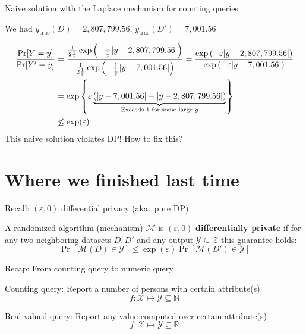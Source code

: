 \documentclass[12pt,aspectratio=169,handout]{beamer}
\begin{document}
\begin{frame}{Naive solution with the Laplace mechanism for counting queries}

We had $y_{\mathrm{true}}(D) = 2,807,799.56$, $y_{\mathrm{true}}(D') = 7,001.56$

$$
\begin{aligned}
\frac{\Pr[Y = y]}{\Pr[Y' = y]} &=
\frac{
\frac{1}{2\frac{1}{\varepsilon}} \exp \left(- \frac{1}{\frac{1}{\varepsilon}} \abs{y - 2,807,799.56} \right)
}{
\frac{1}{2\frac{1}{\varepsilon}} \exp \left(- \frac{1}{\frac{1}{\varepsilon}} \abs{y - 7,001.56} \right) 
}
=
\frac{
\exp \left(- \varepsilon \abs{y - 2,807,799.56} \right)
}{
\exp \left(- \varepsilon \abs{y - 7,001.56} \right) 
} \\
&=
\exp \left\{ \varepsilon
\underbrace{
\left( \abs{y - 7,001.56} - \abs{y - 2,807,799.56} \right)
}_{\text{Exceeds 1 for some large } y}
\right\} \\
& \nleq \exp(\varepsilon) \\
\end{aligned}
$$
This naive solution violates DP! How to fix this?
\end{frame}


\section{Where we finished last time}


\begin{frame}{Recall: $(\varepsilon, 0)$ differential privacy (aka.\ pure DP)}

A randomized algorithm (mechanism) $\mathcal{M}$ is $(\varepsilon, 0)$-\textbf{differentially private} if for any two neighboring datasets $D, D'$ and any output $\mathcal{Y} \subseteq \mathcal{Z}$ this guarantee holds:
$$
\Pr[\mathcal{M}(D) \in \mathcal{Y}] \leq \exp(\varepsilon) \Pr[\mathcal{M}(D') \in \mathcal{Y}]
$$


\end{frame}


\begin{frame}{Recap: From counting query to numeric query}

Counting query: Report a number of persons with certain attribute(s)
$$
f: \mathcal{X} \mapsto \mathcal{Y} \subseteq \mathbb{N}
$$

Real-valued query: Report any value computed over certain attribute(s)
$$
f: \mathcal{X} \mapsto \mathcal{Y} \subseteq \mathbb{R}
$$

\end{frame}
\end{document}
